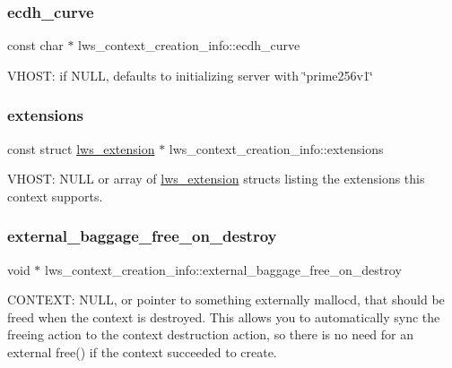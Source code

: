 \subsubsection{\texorpdfstring{ecdh\+\_\+curve}{ecdh\_curve}}
{\footnotesize\ttfamily const char $\ast$ lws\+\_\+context\+\_\+creation\+\_\+info\+::ecdh\+\_\+curve}

V\+H\+O\+ST\+: if N\+U\+LL, defaults to initializing server with \char`\"{}prime256v1\char`\"{} \mbox{\label{structlws__context__creation__info_a441e436acc5a816ab38a705ca9d11b72}} 
\subsubsection{\texorpdfstring{extensions}{extensions}}
{\footnotesize\ttfamily const struct \hyperlink{structlws__extension}{lws\+\_\+extension} $\ast$ lws\+\_\+context\+\_\+creation\+\_\+info\+::extensions}

V\+H\+O\+ST\+: N\+U\+LL or array of \hyperlink{structlws__extension}{lws\+\_\+extension} structs listing the extensions this context supports. \mbox{\label{structlws__context__creation__info_ad050e82073957b8a89e24ddb84aaba14}} 
\subsubsection{\texorpdfstring{external\+\_\+baggage\+\_\+free\+\_\+on\+\_\+destroy}{external\_baggage\_free\_on\_destroy}}
{\footnotesize\ttfamily void $\ast$ lws\+\_\+context\+\_\+creation\+\_\+info\+::external\+\_\+baggage\+\_\+free\+\_\+on\+\_\+destroy}

C\+O\+N\+T\+E\+XT\+: N\+U\+LL, or pointer to something externally malloc\textquotesingle{}d, that should be freed when the context is destroyed. This allows you to automatically sync the freeing action to the context destruction action, so there is no need for an external free() if the context succeeded to create. \mbox{\label{structlws__context__creation__info_a45e63e24c88289e0c8352377ef4d3646}} 
